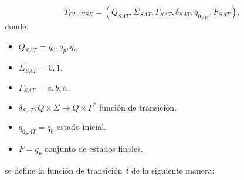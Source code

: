 \[
    T_{CLAUSE} = (Q_{SAT}, {\Sigma}_{SAT}, \Gamma_{SAT}, \delta_{SAT}, q_{0_{SAT}}, F_{SAT}),
\]
donde:
\begin{itemize}
    \item \(Q_{SAT}\) = ${q_0,q_p,q_n}$.
    \item \(\Sigma_{SAT}\) = ${0,1}$.
    \item \(\Gamma_{SAT}\) = ${a,b,c}$.
    \item \(\delta_{SAT}: Q \times \Sigma \to Q \times \Gamma^*\) función de transición.
    \item \(q_{0_SAT} = q_0\) estado inicial.
    \item \(F={q_p}\) conjunto de estados finales.
\end{itemize}
se define la función de transición $\delta$ de la siguiente manera:

